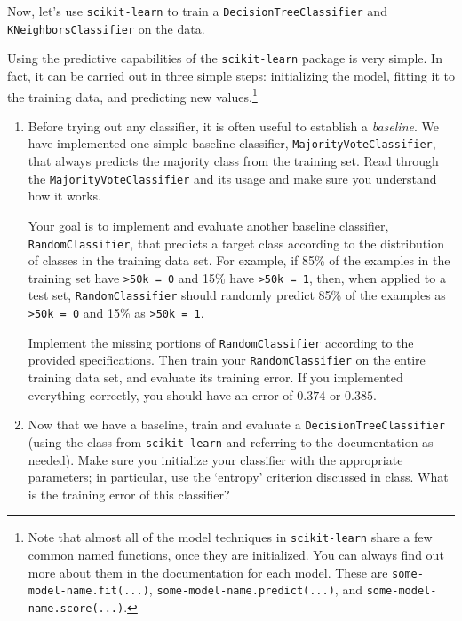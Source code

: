 Now, let's use \verb|scikit-learn| to train a \verb|DecisionTreeClassifier| and \verb|KNeighborsClassifier| on the data.

Using the predictive capabilities of the \verb|scikit-learn| package is very simple. In fact, it can be carried out in three simple steps: initializing the model, fitting it to the training data, and predicting new values.\footnote{Note that almost all of the model techniques in \verb|scikit-learn| share a few common named functions, once they are initialized. You can always find out more about them in the documentation for each model. These are \verb|some-model-name.fit(...)|, \verb|some-model-name.predict(...)|, and \verb|some-model-name.score(...)|.}


\begin{enumerate}[resume]

\item {} Before trying out any classifier, it is often useful to establish a \emph{baseline}. We have implemented one simple baseline classifier, \verb|MajorityVoteClassifier|, that always predicts the majority class from the training set. Read through the \verb|MajorityVoteClassifier| and its usage and make sure you understand how it works.

Your goal is to implement and evaluate another baseline classifier, \verb|RandomClassifier|, that predicts a target class according to the distribution of classes in the training data set. For example, if 85\% of the examples in the training set have \verb|>50k = 0| and 15\% have \verb|>50k = 1|, then, when applied to a test set, \verb|RandomClassifier| should randomly predict 85\% of the examples as \verb|>50k = 0| and 15\% as \verb|>50k = 1|.

Implement the missing portions of \verb|RandomClassifier| according to the provided specifications. Then train your \verb|RandomClassifier| on the entire training data set, and evaluate its training error. If you implemented everything correctly, you should have an error of {\color {red} {$0.374$} } or {\color {red} {$0.385$.} }

\item {} Now that we have a baseline, train and evaluate a \verb|DecisionTreeClassifier| (using the class from \verb|scikit-learn| and referring to the documentation as needed). Make sure you initialize your classifier with the appropriate parameters; in particular, use the `entropy' criterion discussed in class. What is the training error of this classifier?


\end{enumerate}

